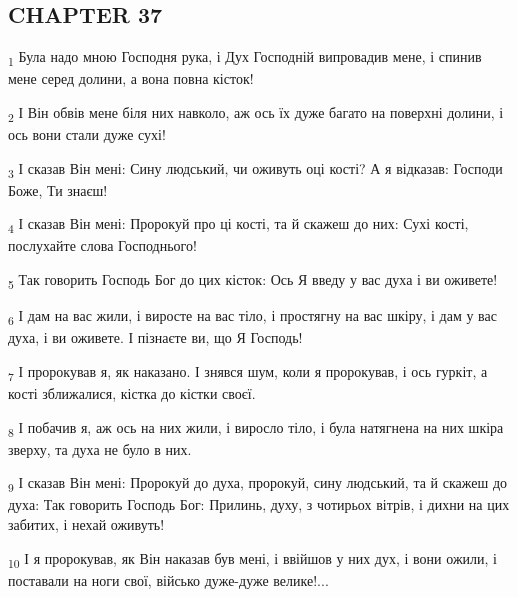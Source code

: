 \subsection{CHAPTER 37}
\begin{tcolorbox}
\textsubscript{1} Була надо мною Господня рука, і Дух Господній випровадив мене, і спинив мене серед долини, а вона повна кісток!
\end{tcolorbox}
\begin{tcolorbox}
\textsubscript{2} І Він обвів мене біля них навколо, аж ось їх дуже багато на поверхні долини, і ось вони стали дуже сухі!
\end{tcolorbox}
\begin{tcolorbox}
\textsubscript{3} І сказав Він мені: Сину людський, чи оживуть оці кості? А я відказав: Господи Боже, Ти знаєш!
\end{tcolorbox}
\begin{tcolorbox}
\textsubscript{4} І сказав Він мені: Пророкуй про ці кості, та й скажеш до них: Сухі кості, послухайте слова Господнього!
\end{tcolorbox}
\begin{tcolorbox}
\textsubscript{5} Так говорить Господь Бог до цих кісток: Ось Я введу у вас духа і ви оживете!
\end{tcolorbox}
\begin{tcolorbox}
\textsubscript{6} І дам на вас жили, і виросте на вас тіло, і простягну на вас шкіру, і дам у вас духа, і ви оживете. І пізнаєте ви, що Я Господь!
\end{tcolorbox}
\begin{tcolorbox}
\textsubscript{7} І пророкував я, як наказано. І знявся шум, коли я пророкував, і ось гуркіт, а кості зближалися, кістка до кістки своєї.
\end{tcolorbox}
\begin{tcolorbox}
\textsubscript{8} І побачив я, аж ось на них жили, і виросло тіло, і була натягнена на них шкіра зверху, та духа не було в них.
\end{tcolorbox}
\begin{tcolorbox}
\textsubscript{9} І сказав Він мені: Пророкуй до духа, пророкуй, сину людський, та й скажеш до духа: Так говорить Господь Бог: Прилинь, духу, з чотирьох вітрів, і дихни на цих забитих, і нехай оживуть!
\end{tcolorbox}
\begin{tcolorbox}
\textsubscript{10} І я пророкував, як Він наказав був мені, і ввійшов у них дух, і вони ожили, і поставали на ноги свої, військо дуже-дуже велике!...
\end{tcolorbox}
